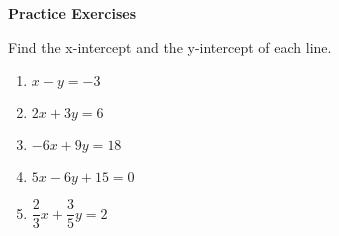 \textbf{Practice Exercises}

\vspce

Find the x-intercept and the y-intercept of each line. 
\begin{enumerate}[label = \arabic*. ]
\item \hspce $x-y=-3$
\item \hspce $2x+3y=6$
\item \hspce $-6x+9y=18$
\item \hspce $5x-6y+15=0$
\item \hspce $\dfrac{2}{3}x+ \dfrac{3}{5}y=2$  
\end{enumerate}  